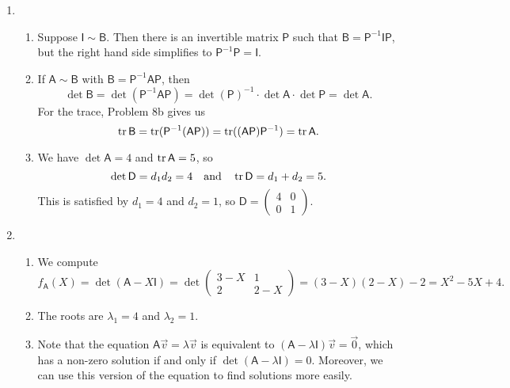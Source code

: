 \begin{enumerate}
\begin{enumerate}
\end{enumerate}
\item \begin{enumerate}
\item Suppose $\mathsf{I}\sim\mathsf{B}$. Then there is an invertible matrix $\mathsf{P}$ such that $\mathsf{B} = \mathsf{P}^{-1}\mathsf{IP}$, but the right hand side simplifies to $\mathsf{P}^{-1}\mathsf{P} = \mathsf{I}$.
\item If $\mathsf{A}\sim\mathsf{B}$ with $\mathsf{B} = \mathsf{P}^{-1}\mathsf{AP}$, then
\begin{equation*}
\det\mathsf{B} = \det(\mathsf{P}^{-1}\mathsf{AP}) = \det(\mathsf{P})^{-1}\cdot\det\mathsf{A}\cdot\det\mathsf{P} = \det\mathsf{A}.
\end{equation*}
For the trace, Problem 8b gives us
\begin{equation*}
\operatorname{tr}\mathsf{B} = \operatorname{tr}(\mathsf{P}^{-1}(\mathsf{AP})) = \operatorname{tr}((\mathsf{AP})\mathsf{P}^{-1}) = \operatorname{tr}\mathsf{A}.
\end{equation*}
\item We have $\det\mathsf{A} = 4$ and $\operatorname{tr}\mathsf{A} = 5$, so
\begin{equation*}
\det\mathsf{D} = d_1d_2 = 4\quad\text{and}\quad\operatorname{tr}\mathsf{D} = d_1 + d_2 = 5.
\end{equation*}
This is satisfied by $d_1 = 4$ and $d_2 = 1$, so $\mathsf{D} = \begin{pmatrix} 4 & 0 \\ 0 & 1 \end{pmatrix}$.
\end{enumerate}
\item \begin{enumerate}
\item We compute
\begin{equation*}
f_{\mathsf{A}}(X) = \det(\mathsf{A} - X\mathsf{I}) = \det\begin{pmatrix} 3 - X & 1 \\ 2 & 2 - X \end{pmatrix} = (3 - X)(2 - X) - 2 = X^2 - 5X + 4.
\end{equation*}
\item The roots are $\lambda_1 = 4$ and $\lambda_2 = 1$.
\item Note that the equation $\mathsf{A}\vec{v} = \lambda\vec{v}$ is equivalent to $(\mathsf{A} - \lambda\mathsf{I})\vec{v} = \vec{0}$, which has a non-zero solution if and only if $\det(\mathsf{A} - \lambda\mathsf{I}) = 0$. Moreover, we can use this version of the equation to find solutions more easily.\par

\end{enumerate}
\end{enumerate}
